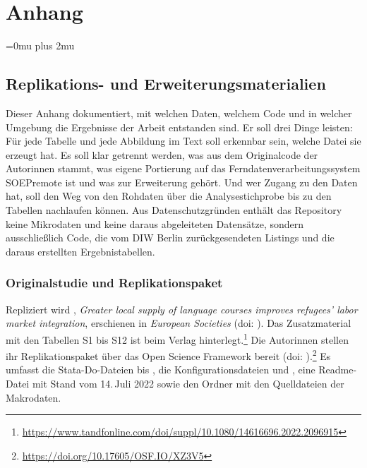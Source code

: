 %
\chapter{Anhang}
\label{cha:anhang}

\Urlmuskip=0mu plus 2mu
\expandafter\def\expandafter\UrlBreaks\expandafter{\UrlBreaks\do\_}

\section{Replikations- und Erweiterungsmaterialien}
\label{app:material}

Dieser Anhang dokumentiert, mit welchen Daten, welchem Code und in welcher Umgebung die Ergebnisse der Arbeit entstanden sind. Er soll drei Dinge leisten: Für jede Tabelle und jede Abbildung im Text soll erkennbar sein, welche Datei sie erzeugt hat. Es soll klar getrennt werden, was aus dem Originalcode der Autorinnen stammt, was eigene Portierung auf das Ferndatenverarbeitungssystem SOEPremote ist und was zur Erweiterung gehört. Und wer Zugang zu den Daten hat, soll den Weg von den Rohdaten über die Analysestichprobe bis zu den Tabellen nachlaufen können. Aus Datenschutzgründen enthält das Repository keine Mikrodaten und keine daraus abgeleiteten Datensätze, sondern ausschließlich Code, die vom DIW Berlin zurückgesendeten Listings und die daraus erstellten Ergebnistabellen.

\subsection{Originalstudie und Replikationspaket}
\label{app:original}

Repliziert wird \textcite{Kanas:2023}, \emph{Greater local supply of language courses improves refugees' labor market integration}, erschienen in \emph{European Societies} (doi: ). Das Zusatzmaterial mit den Tabellen S1 bis S12 ist beim Verlag hinterlegt.\footnote{\url{https://www.tandfonline.com/doi/suppl/10.1080/14616696.2022.2096915}} Die Autorinnen stellen ihr Replikationspaket über das Open Science Framework bereit (doi: ).\footnote{\url{https://doi.org/10.17605/OSF.IO/XZ3V5}} Es umfasst die Stata-Do-Dateien  bis , die Konfigurationsdateien  und , eine Readme-Datei mit Stand vom 14.\,Juli 2022 sowie den Ordner  mit den Quelldateien der Makrodaten.

